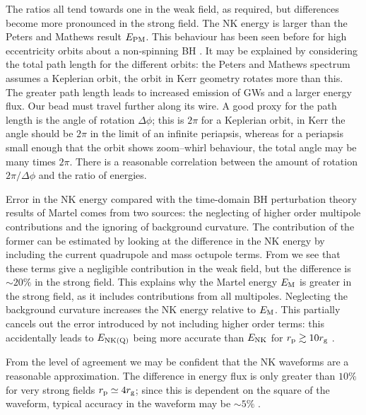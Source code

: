 The ratios all tend towards one in the weak field, as required, but differences become more pronounced in the strong field. The NK energy is larger than the Peters and Mathews result $E_\mathrm{PM}$. This behaviour has been seen before for high eccentricity orbits about a non-spinning BH \citep{Gair2005}. It may be explained by considering the total path length for the different orbits: the Peters and Mathews spectrum assumes a Keplerian orbit, the orbit in Kerr geometry rotates more than this. The greater path length leads to increased emission of GWs and a larger energy flux. Our bead must travel further along its wire. A good proxy for the path length is the angle of rotation $\Delta\phi$; this is $2\pi$ for a Keplerian orbit, in Kerr the angle should be $2\pi$ in the limit of an infinite periapsis, whereas for a periapsis small enough that the orbit shows zoom--whirl behaviour, the total angle may be many times $2\pi$. There is a reasonable correlation between the amount of rotation $2\pi/\Delta\phi$ and the ratio of energies.

Error in the NK energy compared with the time-domain BH perturbation theory results of Martel comes from two sources: the neglecting of higher order multipole contributions and the ignoring of background curvature. The contribution of the former can be estimated by looking at the difference in the NK energy by including the current quadrupole and mass octupole terms. From  we see that these terms give a negligible contribution in the weak field, but the difference is $\sim20\%$ in the strong field. This explains why the Martel energy $E_\mathrm{M}$ is greater in the strong field, as it includes contributions from all multipoles. Neglecting the background curvature increases the NK energy relative to $E_\mathrm{M}$. This partially cancels out the error introduced by not including higher order terms: this accidentally leads to $E_\mathrm{NK(Q)}$ being more accurate than $E_\mathrm{NK}$ for $r_\mathrm{p} \gtrsim 10 r_\mathrm{g}$ \citep{Tanaka1993}.

From the level of agreement we may be confident that the NK waveforms are a reasonable approximation. The difference in energy flux is only greater than $10\%$ for very strong fields $r_\mathrm{p} \simeq 4 r_\mathrm{g}$; since this is dependent on the square of the waveform, typical accuracy in the waveform may be $\sim 5\%$ \citep{Gair2005,Tanaka1993}. %

